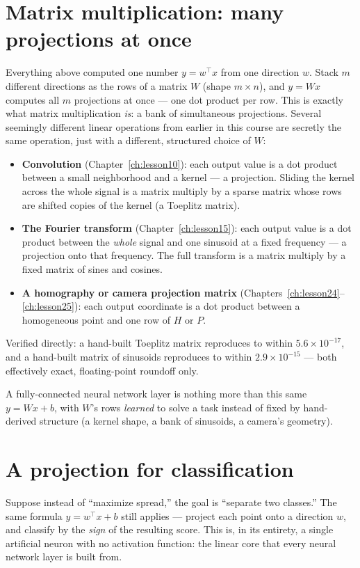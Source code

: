 \section{Matrix multiplication: many projections at once}

Everything above computed one number $y=w^\top x$ from one direction $w$. Stack $m$ different directions as the rows of a matrix $W$ (shape $m\times n$), and $y=Wx$ computes all $m$ projections at once --- one dot product per row. This is exactly what matrix multiplication \emph{is}: a bank of simultaneous projections. Several seemingly different linear operations from earlier in this course are secretly the same operation, just with a different, structured choice of $W$:
\begin{itemize}
  \item \textbf{Convolution} (Chapter~\ref{ch:lesson10}): each output value is a dot product between a small neighborhood and a kernel --- a projection. Sliding the kernel across the whole signal is a matrix multiply by a sparse matrix whose rows are shifted copies of the kernel (a Toeplitz matrix).
  \item \textbf{The Fourier transform} (Chapter~\ref{ch:lesson15}): each output value is a dot product between the \emph{whole} signal and one sinusoid at a fixed frequency --- a projection onto that frequency. The full transform is a matrix multiply by a fixed matrix of sines and cosines.
  \item \textbf{A homography or camera projection matrix} (Chapters~\ref{ch:lesson24}--\ref{ch:lesson25}): each output coordinate is a dot product between a homogeneous point and one row of $H$ or $P$.
\end{itemize}
Verified directly: a hand-built Toeplitz matrix reproduces  to within $5.6\times10^{-17}$, and a hand-built matrix of sinusoids reproduces  to within $2.9\times10^{-15}$ --- both effectively exact, floating-point roundoff only.

A fully-connected neural network layer is nothing more than this same $y=Wx+b$, with $W$'s rows \emph{learned} to solve a task instead of fixed by hand-derived structure (a kernel shape, a bank of sinusoids, a camera's geometry).

\section{A projection for classification}

Suppose instead of ``maximize spread,'' the goal is ``separate two classes.'' The same formula $y=w^\top x+b$ still applies --- project each point onto a direction $w$, and classify by the \emph{sign} of the resulting score. This is, in its entirety, a single artificial neuron with no activation function: the linear core that every neural network layer is built from.

